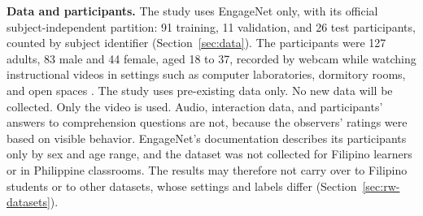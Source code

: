 \textbf{Data and participants.} The study uses EngageNet \cite{singh2023} only, with its official subject-independent partition: 91 training, 11 validation, and 26 test participants, counted by subject identifier (Section~\ref{sec:data}). The participants were 127 adults, 83 male and 44 female, aged 18 to 37, recorded by webcam while watching instructional videos in settings such as computer laboratories, dormitory rooms, and open spaces \cite{singh2023}. The study uses pre-existing data only. No new data will be collected. Only the video is used. Audio, interaction data, and participants' answers to comprehension questions are not, because the observers' ratings were based on visible behavior. EngageNet's documentation describes its participants only by sex and age range, and the dataset was not collected for Filipino learners or in Philippine classrooms. The results may therefore not carry over to Filipino students or to other datasets, whose settings and labels differ (Section~\ref{sec:rw-datasets}).

